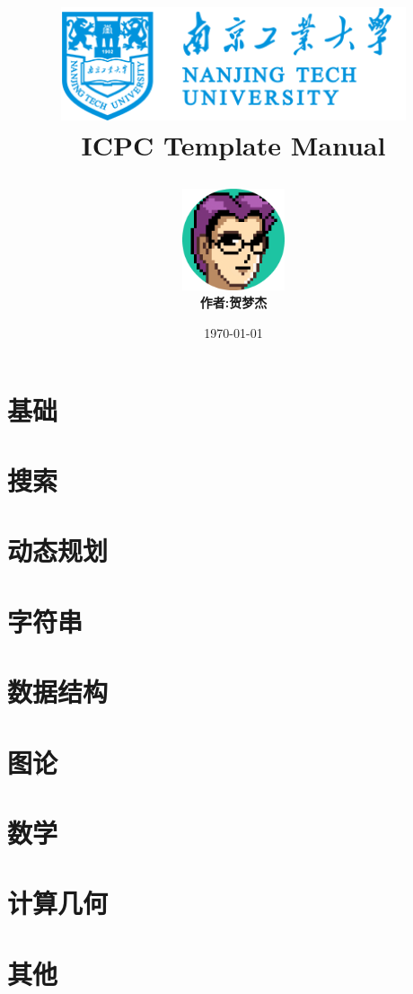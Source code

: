 \documentclass[12pt,a4paper,oneside]{book}
\title{
    \begin{center}
        \includegraphics[width=4in]{logo.png}
        \\ 
        \textbf{ICPC Template Manual}
    \end{center}
}
\author{
    \includegraphics[width=3cm]{author.png}
    \\
    \textbf{作者:贺梦杰}
}
\date{\today}
\begin{document}
    \maketitle
    \tableofcontents

    \chapter{基础}
    

    \chapter{搜索}
    

    \chapter{动态规划}
    

    \chapter{字符串}
    

    \chapter{数据结构}
    
    
    

    \chapter{图论}
    
    
    
    
    

    \chapter{数学}
    

    \chapter{计算几何}
    

    \chapter{其他}
    
\end{document}
